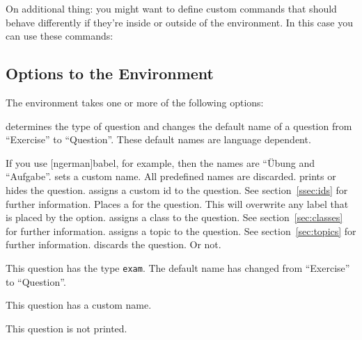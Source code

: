 \documentclass[DIV10,toc=index,toc=bib,numbers=noendperiod]{cnpkgdoc}
\newcommand*\unexpsign{$\RHD$}
\newcommand*\expsign{\textcolor{red}{$\rhd$}}
\renewcommand*\cnpkgdoctriangle{\unexpsign}
\newcommand*\expandable{%
  \def\cnpkgdoctriangle{%
    \expsign
    \gdef\cnpkgdoctriangle{\unexpsign}}}
\begin{document}
On additional thing: you might want to define custom
commands that should behave differently if they're inside or outside of the
 environment.  In this case you can use these commands:
\begin{beschreibung}
  \expandable{}
  \expandable{}
  \expandable{}
\end{beschreibung}

\subsection{Options to the  Environment}
The  environment takes one or more of the following options:
\begin{beschreibung}
    determines the type of question and changes the default name of a question
    from ``Exercise'' to ``Question''.  These default names are language
    dependent.
    
    If you use [ngerman]{babel}, for example, then the names
    are ``\"Ubung and ``Aufgabe''.
  \Default{}
    sets a custom name.  All predefined names are discarded.
    prints or hides the question.
  \Default{}
    assigns a custom \acs{id} to the question.  See section~\ref{ssec:ids} for
    further information.
  \Default{}
    Places a  for the question.  This will overwrite any
    label that is placed by the  option.
  \Default{}
    assigns a class to the question.  See section~\ref{sec:classes} for
    further information.
  \Default{}
    assigns a topic to the question.  See section~\ref{sec:topics} for further
    information.
    discards the question.  Or not.
\end{beschreibung}
\begin{beispiel}
 \begin{question}[type=exam]
  This question has the type \texttt{exam}. The default name has changed from
  ``Exercise'' to ``Question''.
 \end{question}
 \begin{question}[name=Fancy name]
  This question has a custom name.
 \end{question}
 \begin{question}[print=false]
  This question is not printed.
 \end{question}
\end{beispiel}
\end{document}
